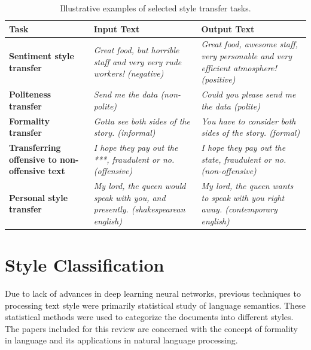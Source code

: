 \documentclass[akbc,twoside,11pt]{article}
\begin{document}
\begin{table}
\centering
\begin{tabularx}{\textwidth} { 
  | >{\raggedright\arraybackslash}X 
  | >{\centering\arraybackslash}X 
  | >{\raggedleft\arraybackslash}X | }
\hline
\textbf{Task} & \textbf{Input Text} & \textbf{Output Text} \\ \hline
\textbf{Sentiment style transfer} & \textit{Great food, but horrible staff and very very rude workers! (negative)} & \textit{Great food, awesome staff, very personable and very efficient atmosphere! (positive)} \\ \hline
\textbf{Politeness transfer} & \textit{Send me the data (non-polite)} & \textit{Could you please send me the data (polite)} \\ \hline
\textbf{Formality transfer} & \textit{Gotta see both sides of the story. (informal)} & \textit{You have to consider both sides of the story. (formal)} \\ \hline
\textbf{Transferring offensive to non-offensive text} & \textit{I hope they pay out the ***, fraudulent or no. (offensive)} & \textit{I hope they pay out the state,	fraudulent or no. (non-offensive)} \\ \hline
\textbf{Personal style transfer} & \textit{My lord, the queen would speak with you, and presently. (shakespearean english)} & \textit{My lord, the queen wants to speak with you right away. (contemporary english)} \\ \hline\end{tabularx}
\caption{\label{tab:tasks} Illustrative examples of selected style transfer tasks.}
\end{table}

\section{Style Classification}

Due to lack of advances in deep learning neural networks, previous techniques to processing text style were primarily statistical study of language semantics. These statistical methods were used to categorize the documents into different styles. The papers included for this review are concerned with the concept of formality in language and its applications in natural language processing.
\end{document}
